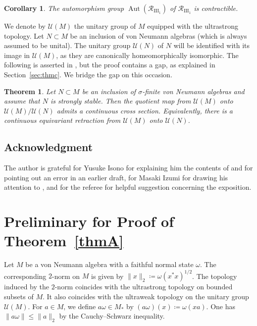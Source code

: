 \documentclass[12pt,nosumlimits,nonamelimits]{amsart}
\newtheorem{thmA}{Theorem}
\newtheorem*{corA}{Corollary}
\theoremstyle{remark}
\newcommand{\cR}{\mathcal{R}}
\newcommand{\cU}{\mathcal{U}}
\DeclareMathOperator{\Aut}{Aut}
\begin{document}
\begin{corA}\label{corB}
The automorphism group $\Aut(\cR_{\mathrm{III}_1})$ 
of $\cR_{\mathrm{III}_1}$ is contractible. 
\end{corA}

We denote by $\cU(M)$ the unitary group of $M$ 
equipped with the ultrastrong topology. 
Let $N\subset M$ be an inclusion of von Neumann algebras 
(which is always assumed to be unital). 
The unitary group $\cU(N)$ of $N$ will be identified 
with its image in $\cU(M)$, as they are canonically 
homeomorphically isomorphic. 
The following is asserted in \cite{pt}, 
but the proof contains a gap, as explained in Section~\ref{sec:thmc}. 
We bridge the gap on this occasion. 

\begin{thmA}\label{thmB}
Let $N\subset M$ be an inclusion of $\sigma$-finite 
von Neumann algebras and assume 
that $N$ is strongly stable. 
Then the quotient map from $\mathcal{U}(M)$ 
onto $\mathcal{U}(M)/\mathcal{U}(N)$ 
admits a continuous cross section. 
Equivalently, there is a continuous equivariant retraction 
from $\cU(M)$ onto $\cU(N)$.
\end{thmA}

\subsection*{Acknowledgment} 
The author is grateful for Yusuke Isono for explaining 
him the contents of \cite{pt} and for pointing out an error 
in an earlier draft, for Masaki Izumi for drawing his attention 
to \cite{dp}, and for the referee for helpful suggestion concerning 
the exposition.
%
\section{Preliminary for Proof of Theorem~\ref{thmA}}\label{sec:prelim}
%
Let $M$ be a von Neumann algebra with a faithful normal 
state $\omega$. 
The corresponding $2$-norm on $M$ is given by 
$\|x\|_2\coloneqq\omega(x^*x)^{1/2}$. 
The topology induced by the $2$-norm coincides 
with the ultrastrong topology on bounded subsets of $M$. 
It also coincides with the ultraweak topology on 
the unitary group $\cU(M)$. 
For $a\in M$, we define $a\omega\in M_*$ by 
$(a\omega)(x)\coloneqq\omega(xa)$. 
One has $\|a\omega\|\le\|a\|_2$ 
by the Cauchy--Schwarz inequality.
\end{document}
